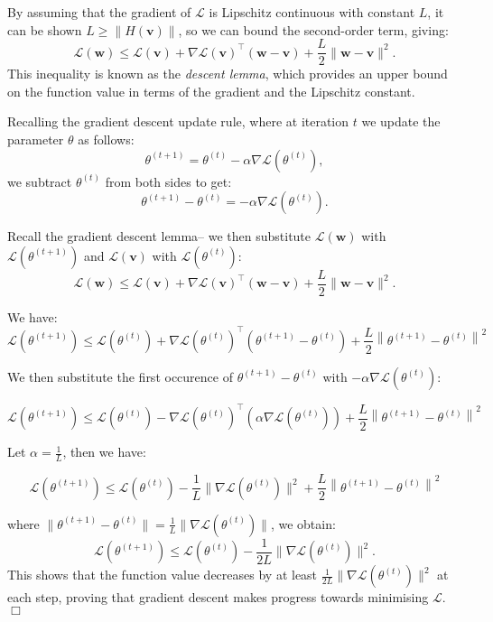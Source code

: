 By assuming that the gradient of $\mathcal{L}$ is Lipschitz continuous with constant $L$, it can be shown $L \geq \|H(\bm{v})\|$, so we can bound the second-order term, giving:
\[
    \mathcal{L}(\bm{w}) \leq \mathcal{L}(\bm{v}) + \nabla \mathcal{L}(\bm{v})^\top (\bm{w} - \bm{v}) + \frac{L}{2} \|\bm{w} - \bm{v}\|^2.
\]
This inequality is known as the \textit{descent lemma}, which provides an upper bound on the function value in terms of the gradient and the Lipschitz constant.

Recalling the gradient descent update rule, where at iteration \(t\) we update the parameter \(\theta\) as follows:
\[
    \theta^{(t+1)} = \theta^{(t)} - \alpha \nabla \mathcal{L}(\theta^{(t)}),
\]
we subtract \(\theta^{(t)}\) from both sides to get:
\[
    \theta^{(t+1)} - \theta^{(t)} = -\alpha \nabla \mathcal{L}(\theta^{(t)}).
\]

Recall the gradient descent lemma– we then substitute $\mathcal{L}(\bm{w})$ with $\mathcal{L}(\theta^{(t+1)})$ and $\mathcal{L}(\bm{v})$ with $\mathcal{L}(\theta^{(t)})$:
\[
    \mathcal{L}(\bm{w}) \leq \mathcal{L}(\bm{v}) + \nabla \mathcal{L}(\bm{v})^\top (\bm{w} - \bm{v}) + \frac{L}{2} \|\bm{w} - \bm{v}\|^2.
\]

We have:
\[
    \mathcal{L}(\theta^{(t+1)})\leq\mathcal{L}(\theta^{(t)})+\nabla\mathcal{L}(\theta^{(t)})^\top(\theta^{(t+1)}-\theta^{(t)})+\frac L2\left\|\theta^{(t+1)}-\theta^{(t)}\right\|^2
\]

We then substitute the first occurence of $\theta^{(t+1)} - \theta^{(t)}$ with $-\alpha \nabla \mathcal{L}(\theta^{(t)})$:

\[
    \mathcal{L}(\theta^{(t+1)}) \leq \mathcal{L}(\theta^{(t)}) - \nabla \mathcal{L}(\theta^{(t)})^\top (\alpha \nabla \mathcal{L}(\theta^{(t)})) + \frac L2\left\|\theta^{(t+1)}-\theta^{(t)}\right\|^2
\]

Let $\alpha = \frac{1}{L}$, then we have:

\[
    \mathcal{L}(\theta^{(t+1)})\leq\mathcal{L}(\theta^{(t)})-\frac1L\|\nabla\mathcal{L}(\theta^{(t)})\|^2+\frac L2\left\|\theta^{(t+1)}-\theta^{(t)}\right\|^2
\]


where \(\|\theta^{(t+1)} - \theta^{(t)}\| = \frac{1}{L} \|\nabla \mathcal{L}(\theta^{(t)})\|\), we obtain:
\[
    \mathcal{L}(\theta^{(t+1)}) \leq \mathcal{L}(\theta^{(t)}) - \frac{1}{2L} \|\nabla \mathcal{L}(\theta^{(t)})\|^2.
\]
This shows that the function value decreases by at least \(\frac{1}{2L} \|\nabla \mathcal{L}(\theta^{(t)})\|^2\) at each step, proving that gradient descent makes progress towards minimising \(\mathcal{L}\).
\hfill\(\Box\)

